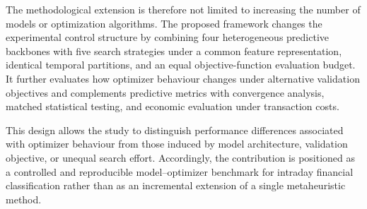 The methodological extension is therefore not limited to increasing the number of models or optimization algorithms. The proposed framework changes the experimental control structure by combining four heterogeneous predictive backbones with five search strategies under a common feature representation, identical temporal partitions, and an equal objective-function evaluation budget. It further evaluates how optimizer behaviour changes under alternative validation objectives and complements predictive metrics with convergence analysis, matched statistical testing, and economic evaluation under transaction costs.

This design allows the study to distinguish performance differences associated with optimizer behaviour from those induced by model architecture, validation objective, or unequal search effort. Accordingly, the contribution is positioned as a controlled and reproducible model--optimizer benchmark for intraday financial classification rather than as an incremental extension of a single metaheuristic method.